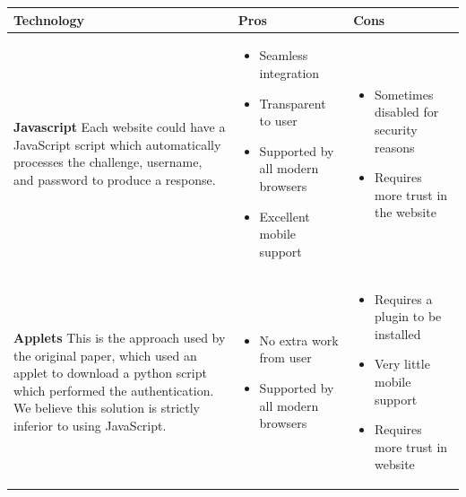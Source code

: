\documentclass[11pt]{article}
\begin{document}
\small
\begin{center}
    \begin{tabular}{|  p{6cm} | p{5cm} | p{5cm} |}
    \hline
    Technology & Pros & Cons \\ \hline
    \vspace{.4cm}
    \textbf{Javascript}
    Each website could have a JavaScript script which automatically processes the challenge, username, and password to produce a response. & 

    \begin{itemize}[leftmargin=*]
    \item Seamless integration

    \item Transparent to user

    \item Supported by all modern browsers

    \item Excellent mobile support
    \end{itemize}
    &
    \begin{itemize}[leftmargin=*]
    \item Sometimes disabled for security reasons

    \item Requires more trust in the website
    \end{itemize}
    \\ \hline
    \vspace{.4cm}
    \textbf{Applets}
    This is the approach used by the original paper, which used an applet to download a python script which performed the authentication. We believe this solution is strictly inferior to using JavaScript.
    \vspace{.4cm}
    &
    \begin{itemize}[leftmargin=*]
    \item No extra work from user

    \item  Supported by all modern browsers
    \end{itemize}
    &
    \begin{itemize}[leftmargin=*]
    \item Requires a plugin to be installed

    \item Very little mobile support

    \item Requires more trust in website
    \end{itemize}


\end{tabular}
\end{center}
\end{document}
